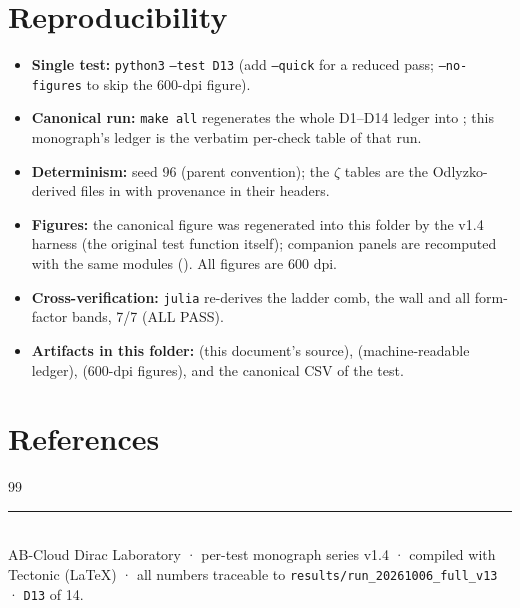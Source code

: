 \documentclass[11pt,a4paper]{article}
\begin{document}
\section{Reproducibility}
\begin{itemize}[leftmargin=1.2em, itemsep=0.15em]
\item \textbf{Single test:} \texttt{python3}  \texttt{--test D13} (add \texttt{--quick} for a reduced pass; \texttt{--no-figures} to skip the 600-dpi figure).
\item \textbf{Canonical run:} \texttt{make all} regenerates the whole D1--D14 ledger into ; this monograph's ledger is the verbatim per-check table of that run.
\item \textbf{Determinism:} seed 96 (parent convention); the $\zeta$ tables are the Odlyzko-derived files in  with provenance in their headers.
\item \textbf{Figures:} the canonical figure was regenerated into this folder by the v1.4 harness (the original test function itself); companion panels are recomputed with the same modules (). All figures are 600 dpi.
\item \textbf{Cross-verification:} \texttt{julia}  re-derives the ladder comb, the wall and all form-factor bands, 7/7 (ALL PASS).
\item \textbf{Artifacts in this folder:}  (this document's source),  (machine-readable ledger),  (600-dpi figures), and the canonical CSV of the test.
\end{itemize}

\section*{References}
\begin{thebibliography}{99}\small
\end{thebibliography}

\vfill
\noindent\rule{\textwidth}{0.4pt}\\[0.2em]
{\footnotesize\color{labgray} AB-Cloud Dirac Laboratory · per-test monograph series v1.4 · compiled with Tectonic (LaTeX) · all numbers traceable to \texttt{results/run\_20261006\_full\_v13} · \texttt{D13} of 14.}
\end{document}
